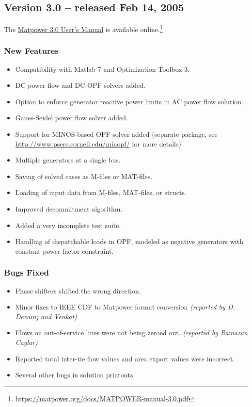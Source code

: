 \documentclass[12pt]{article}
\newcommand{\matlab}[0]{{\sc Matlab}}
\newcommand{\matpower}[0]{{\sc Matpower}}
\newcommand{\ot}[0]{{Optimization Toolbox}}
\numberwithin{equation}{section}
\numberwithin{table}{section}
\numberwithin{figure}{section}
\begin{document}
\begin{appendices}
\pagebreak
\subsection{Version 3.0 -- released Feb 14, 2005}
\label{app:v30}

The \href{https://matpower.org/docs/MATPOWER-manual-3.0.pdf}{\matpower{} 3.0 User's Manual} is available online.\footnote{\url{https://matpower.org/docs/MATPOWER-manual-3.0.pdf}}

\subsubsection*{New Features}
\begin{itemize}
\item Compatibility with \matlab{} 7 and \ot{} 3.
\item DC power flow and DC OPF solvers added.
\item Option to enforce generator reactive power limits in AC power flow solution.
\item Gauss-Seidel power flow solver added.
\item Support for MINOS-based OPF solver added (separate package, see \\ \url{http://www.pserc.cornell.edu/minopf/} for more details)
\item Multiple generators at a single bus.
\item Saving of solved cases as M-files or MAT-files.
\item Loading of input data from M-files, MAT-files, or structs.
\item Improved decommitment algorithm.
\item Added a very incomplete test suite.
\item Handling of dispatchable loads in OPF, modeled as negative generators with constant power factor constraint.
\end{itemize}

\subsubsection*{Bugs Fixed}
\begin{itemize}
\item Phase shifters shifted the wrong direction.
\item Minor fixes to IEEE CDF to \matpower{} format conversion \emph{(reported by D. Devaraj and Venkat)}
\item Flows on out-of-service lines were not being zeroed out. \emph{(reported by Ramazan Caglar)}
\item Reported total inter-tie flow values and area export values were incorrect.
\item Several other bugs in solution printouts.
\end{itemize}



\end{appendices}
\end{document}
